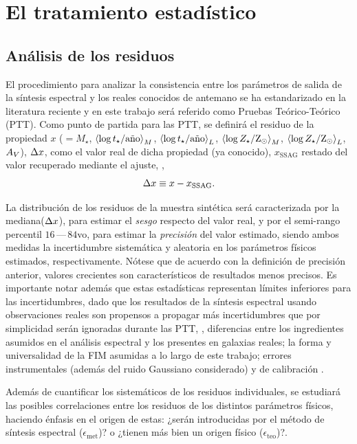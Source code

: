 \section{El tratamiento estadístico}

\subsection{Análisis de los residuos}

El procedimiento para analizar la consistencia entre los parámetros de salida de la síntesis
espectral y los reales conocidos de antemano se ha estandarizado en la literatura reciente
\citep[\eg,][]{Lee2009, Wuyts2009, Pforr2012, Mitchell2013, Magris2015} y en este trabajo será
referido como Pruebas Teórico-Teórico (PTT). Como punto de partida para las PTT, se definirá el
residuo de la propiedad $x$ ($=M_\star$, $\mwla$, $\lwla$, $\mwlz$, $\lwlz$, $\extv$), $\res{x}$,
como el valor real de dicha propiedad (ya conocido), $x_\text{SSAG}$ restado del valor recuperado
mediante el ajuste, \ie,
%
\begin{equation}\label{ec:residual}
\res{x} \equiv x - x_\text{SSAG}.
\end{equation}

La distribución de los residuos de la muestra sintética será caracterizada por la
mediana($\res{x}$), para estimar el \emph{sesgo} respecto del valor real, y por el semi-rango
percentil $16\,$---$\,84$vo, para estimar la \emph{precisión} del valor estimado, siendo ambos
medidas la incertidumbre sistemática y aleatoria en los parámetros físicos estimados,
respectivamente. Nótese que de acuerdo con la definición de precisión anterior, valores crecientes
son característicos de resultados menos precisos. Es importante notar además que estas estadísticas
representan límites inferiores para las incertidumbres, dado que los resultados de la síntesis
espectral usando observaciones reales son propensos a propagar más incertidumbres que por
simplicidad serán ignoradas durante las PTT, \eg, diferencias entre los ingredientes asumidos en el
análisis espectral y los presentes en galaxias reales; la forma y universalidad de la FIM asumidas a
lo largo de este trabajo; errores instrumentales (además del ruido Gaussiano considerado) y de
calibración \citep[véase][para una revisión más detallada]{Conroy2009, Conroy2010a}.

Además de cuantificar los sistemáticos de los residuos individuales, se estudiará las posibles
correlaciones entre los residuos de los distintos parámetros físicos, haciendo énfasis en el origen
de estas: ¿serán introducidas por el método de síntesis espectral ($\epsilon_\text{met}$)? o ¿tienen
más bien un origen físico ($\epsilon_\text{teo}$)?.

